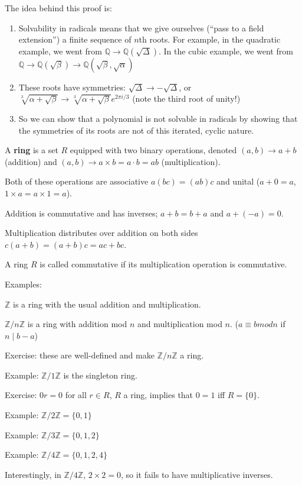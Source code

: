 \documentclass[12pt]{article}
\newcommand{\Z}{\ensuremath{\mathbb{Z}}}
\newcommand{\Q}{\ensuremath{\mathbb{Q}}}
\begin{document}
The idea behind this proof is: \begin{enumerate}
    \item Solvability in radicals means that we give ourselves (``pass to a field extension'') a finite sequence of $n$th roots. For example, in the quadratic example, we went from $\Q \rightarrow \Q(\sqrt{\Delta})$. In the cubic example, we went from $\Q \rightarrow \Q(\sqrt{\beta}) \rightarrow \Q(\sqrt{\beta}, \sqrt{\alpha})$
    \item These roots have symmetries: $\sqrt{\Delta} \rightarrow -\sqrt{\Delta}$, or $\sqrt[3]{\alpha + \sqrt{\beta}} \rightarrow \sqrt[3]{\alpha + \sqrt{\beta}}e^{2\pi i/3}$ (note the third root of unity!)
    \item So we can show that a polynomial is not solvable in radicals by showing that the symmetries of its roots are not of this iterated, cyclic nature.
\end{enumerate}


A \textbf{ring} is a set $R$ equipped with two binary operations, denoted $(a, b) \rightarrow a + b$ (addition) and $(a, b) \rightarrow a \times b = a \cdot b = ab$ (multiplication).

Both of these operations are associative $a(bc) = (ab)c$ and unital ($a + 0 = a$, $1 \times a = a \times 1 = a$).

Addition is commutative and has inverses; $a + b = b + a$ and $a + (-a) = 0$.

Multiplication distributes over addition on both sides $c(a + b) = (a + b)c = ac + bc$.

A ring $R$ is called commutative if its multiplication operation is commutative.

Examples:

$\Z$ is a ring with the usual addition and multiplication.

$\Z/n\Z$ is a ring with addition mod $n$ and multiplication mod $n$. ($a \equiv b mod n$ if $n \mid b - a$)

Exercise: these are well-defined and make $\Z/n\Z$ a ring.

Example: $\Z/1\Z$ is the singleton ring.

Exercise: $0r = 0$ for all $r \in R$, $R$ a ring, implies that $0 = 1$ iff $R = \{ 0 \}$.

Example: $\Z/2\Z = \{ 0, 1 \}$

Example: $\Z/3\Z = \{ 0, 1, 2 \}$

Example: $\Z/4\Z = \{ 0, 1, 2, 4 \}$

Interestingly, in $\Z/4\Z$, $2 \times 2 = 0$, so it fails to have multiplicative inverses.
\end{document}
